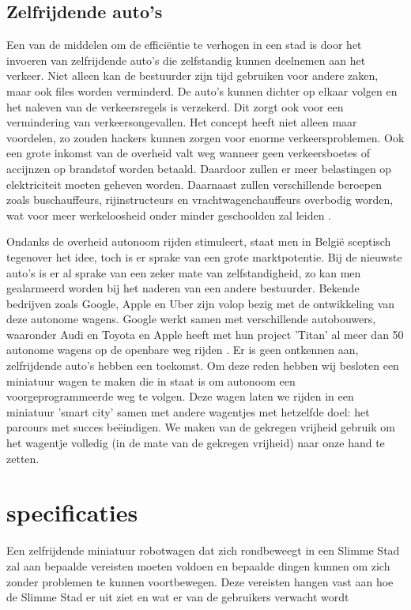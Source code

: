 \documentclass[a4paper,kulak]{kulakarticle}
\begin{document}
\subsection{Zelfrijdende auto's}


Een van de middelen om de efficiëntie te verhogen in een stad is door het invoeren van zelfrijdende auto's die zelfstandig kunnen deelnemen aan het verkeer. Niet alleen kan de bestuurder zijn tijd gebruiken voor andere zaken, maar ook files worden verminderd. De auto's kunnen dichter op elkaar volgen en het naleven van de verkeersregels is verzekerd. Dit zorgt ook voor een vermindering van verkeersongevallen. Het concept heeft niet alleen maar voordelen, zo zouden hackers kunnen zorgen voor enorme verkeersproblemen. Ook een grote inkomst van de overheid valt weg wanneer geen verkeersboetes of accijnzen op brandstof worden betaald. Daardoor zullen er meer belastingen op elektriciteit moeten geheven worden. Daarnaast zullen verschillende beroepen zoals buschauffeurs, rijinstructeurs en vrachtwagenchauffeurs overbodig worden, wat voor meer werkeloosheid onder minder geschoolden zal leiden \cite{procontracars}.

Ondanks de overheid autonoom rijden stimuleert, staat men in België sceptisch tegenover het idee, toch is er sprake van een grote marktpotentie. Bij de nieuwste auto's is er al sprake van een zeker mate van zelfstandigheid, zo kan men gealarmeerd worden bij het naderen van een andere bestuurder. Bekende bedrijven zoals Google, Apple en Uber zijn volop bezig met de ontwikkeling van deze autonome wagens. Google werkt samen met verschillende autobouwers, waaronder Audi en Toyota en Apple heeft met hun project 'Titan' al meer dan 50 autonome wagens op de openbare weg rijden \cite{bedrijven}. Er is geen ontkennen aan, zelfrijdende auto's hebben een toekomst. Om deze reden hebben wij besloten een miniatuur wagen te maken die in staat is om autonoom een voorgeprogrammeerde weg te volgen. Deze wagen laten we rijden in een miniatuur 'smart city' samen met andere wagentjes met hetzelfde doel: het parcours met succes beëindigen. We maken van de gekregen vrijheid gebruik om het wagentje volledig (in de mate van de gekregen vrijheid) naar onze hand te zetten.
\section{specificaties}
Een zelfrijdende miniatuur robotwagen dat zich rondbeweegt in een Slimme Stad zal aan bepaalde vereisten moeten voldoen en bepaalde dingen kunnen om zich zonder problemen te kunnen voortbewegen. Deze vereisten hangen vast aan hoe de Slimme Stad er uit ziet en wat er van de gebruikers verwacht wordt
\end{document}
